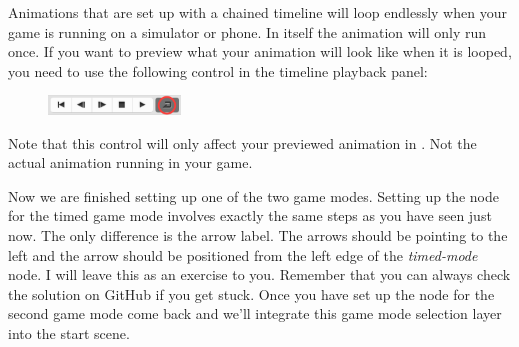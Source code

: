 \begin{details}[frametitle={Looping animations in \SB{}}]
Animations that are set up with a chained timeline will loop endlessly when your
game is running on a simulator or phone. In \SB{} itself the animation will only
run once. If you want to preview what your animation will look like when it is
looped, you need to use the following control in the timeline playback panel:
\begin{figure}[H]
\centering
\includegraphics[width=100pt]{images/Chapter7/loop_timeline.png}
\end{figure}
Note that this control will only affect your previewed animation in \SB{}. Not
the actual animation running in your game.
\end{details}

Now we are finished setting up one of the two game modes. Setting up the node
for the timed game mode involves exactly the same steps as you have seen just
now. The only difference is the arrow label. The arrows should be pointing to
the left and the arrow should be positioned from the left edge of the
\textit{timed-mode} node. I will leave this as an exercise to you. Remember that
you can always check the solution on GitHub if you get stuck. Once you have set
up the node for the second game mode come back and we'll integrate this game
mode selection layer into the start scene.


